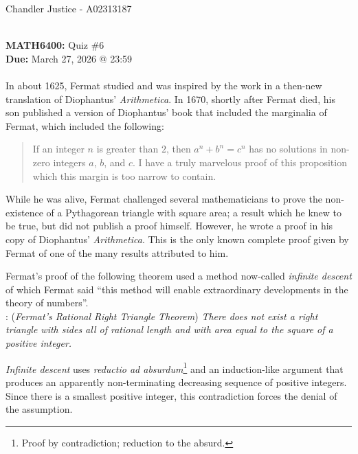 \documentclass[10pt]{article}
\begin{document}
\begin{flushright}
Chandler Justice - A02313187
\end{flushright}
\noindent \underline{\hspace{3in}}\\
\textbf{MATH6400:} Quiz \#6\\
\textbf{Due:} March 27, 2026 @ 23:59\\


	\\
	
		
		In about 1625, Fermat studied and was inspired by the work in a then-new translation of Diophantus' \emph{Arithmetica}.  
		In 1670, shortly after Fermat died, his son published 
		a version of Diophantus' book that included the marginalia of Fermat,
		which included the following: 
		\begin{quotation}
			\noindent If an integer $n$ is greater than $2$, then $a^n + b^n = c^n$ has no solutions in non-zero integers $a$, $b$, and $c$. I have a truly marvelous proof of this proposition which this margin is too narrow to contain.
		\end{quotation}
		
		While he was alive, Fermat challenged several mathematicians to prove the non-existence of a Pythagorean triangle with square area; a result which he knew to be true, but did not publish a proof himself. 
		However, he wrote a proof in his copy of Diophantus' \emph{Arithmetica}.  This is the only known complete proof given by Fermat of one of the  many results attributed to him. 
		
		
	
	Fermat's proof of the following theorem used a method now-called \emph{infinite descent} of which Fermat said ``this method will enable extraordinary developments in the theory of numbers''.\\
	
	: (\emph{Fermat's Rational Right Triangle Theorem}) \emph{There does not exist a right triangle with sides all of rational length and with area equal to the square of a positive integer.}
	
	\emph{Infinite descent} uses \emph{reductio ad absurdum}\footnote{Proof by contradiction; reduction to the absurd.} and an induction-like argument that produces an apparently non-terminating decreasing sequence of positive integers.  
	Since there is a smallest positive integer, this contradiction forces the denial of the assumption.\\
	
\end{document}
